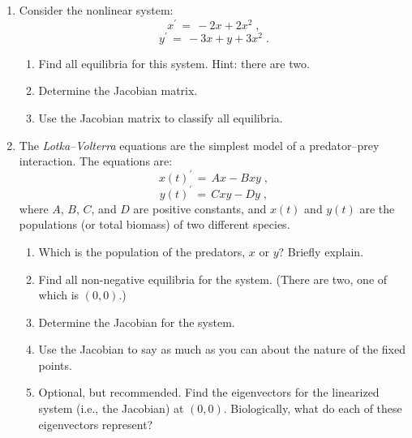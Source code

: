 \documentclass[11pt]{article}
\begin{document}
\begin{enumerate}
\setlength{\itemsep}{3mm}


\item Consider the nonlinear system:
  \begin{equation}
    x^\prime \, = \, -2x + 2x^2 \;,
  \end{equation}
  \begin{equation}
    y^\prime \, = \, -3x + y + 3x^2 \;.
  \end{equation}  
\begin{enumerate}
  \item Find all equilibria for this system.  Hint:  there are two.
  \item Determine the Jacobian matrix.
  \item Use the Jacobian matrix to classify all equilibria.
\end{enumerate}

\item The \emph{Lotka--Volterra} equations are the simplest model of a
  predator--prey interaction.  The equations are:
\begin{equation}
  x(t)^\prime \, = \, Ax - Bxy \;,
\end{equation}
\begin{equation}
  y(t)^\prime \, = \, Cxy - Dy \;,
\end{equation}
where $A$, $B$, $C$, and $D$ are positive constants, and $x(t)$ and
$y(t)$ are the populations (or total biomass) of two different
species. 
\begin{enumerate}
  \item Which is the population of the predators, $x$ or $y$?  Briefly
    explain. 
  \item Find all non-negative equilibria for the system.  (There are
    two, one of which is $(0,0)$.) 
  \item Determine the Jacobian for the system.
  \item Use the Jacobian to say as much as you can about the nature of
    the fixed points.
  \item Optional, but recommended.  Find the eigenvectors for the
    linearized system (i.e., the Jacobian) at $(0,0)$.  Biologically,
    what do each of these eigenvectors represent?  
\end{enumerate}

\end{enumerate}
\end{document}
